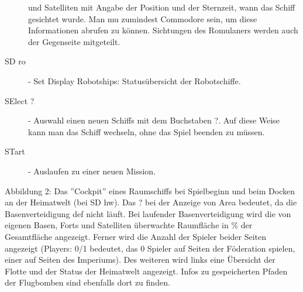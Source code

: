 \begin{description}
                und Satelliten mit Angabe der Position und der Sternzeit, wann
                das Schiff gesichtet wurde. Man mu\3 zumindest Commodore sein,
                um diese Informationen abrufen zu k\"onnen. Sichtungen des 
                Romulaners werden auch der Gegenseite mitgeteilt.
\item [SD ro] - Set Display Robotships: Status\"ubersicht der Robotschiffe.
\item [SElect ?] - Auswahl einen neuen Schiffs mit dem Buchstaben ?. Auf diese
                  Weise kann man das Schiff wechseln, ohne das Spiel beenden 
                  zu m\"ussen. 
\item [STart] - Auslaufen zu einer neuen Mission.
\end{description}

{\sf Abbildung 2: Das ''Cockpit'' eines Raumschiffs bei Spielbeginn und 
                  beim Docken an der Heimatwelt (bei SD hw). Das ? bei
                  der Anzeige von Area bedeutet, da\3 die Basenverteidigung
                  def nicht l\"auft. Bei laufender Basenverteidigung wird die
                  von eigenen Basen, Forts und Satelliten \"uberwachte Raumfl\"ache
                  in $\%$ der Gesamtfl\"ache angezeigt. Ferner wird die Anzahl
                  der Spieler beider Seiten angezeigt (Players: 0/1 bedeutet,
                  das 0 Spieler auf Seiten der F\"oderation spielen, einer auf Seiten
                  des Imperiums). Des weiteren wird links eine \"Ubersicht der 
                  Flotte und der Status der Heimatwelt angezeigt. Infos zu
                  gespeicherten Pfaden der Flugbomben sind ebenfalls dort zu
                  finden.}

